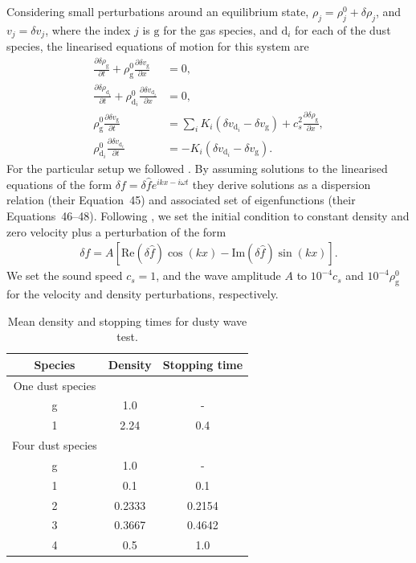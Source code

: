 \documentclass[fleqn,usenatbib]{mnras}
\newcommand{\g}{\mathrm{g}}
\newcommand{\dd}{\mathrm{d}}
\begin{document}
Considering small perturbations around an equilibrium state, \(\rho_j = \rho_j^0
+ \delta \rho_j\), and \(v_j = \delta v_j\), where the index \(j\) is \(\g\) for
the gas species, and \(\dd_i\) for each of the dust species, the linearised
equations of motion for this system are
%
\begin{align}
   \frac{\partial \delta \rho_{\g}}{\partial t}
      + \rho_{\g}^0 \frac{\partial \delta v_{\g}}{\partial x} &= 0, \\
   \frac{\partial \delta \rho_{\dd_i}}{\partial t}
      + \rho_{\dd_i}^0 \frac{\partial \delta v_{\dd_i}}{\partial x} &= 0, \\
   \rho_{\g}^0 \frac{\partial \delta v_{\g}}{\partial t}
      &= \sum_i K_i \left(\delta v_{\dd_i} - \delta v_{\g} \right)
         + c_s^2 \frac{\partial \delta \rho_{\g}}{\partial x}, \\
   \rho_{\dd_i}^0 \frac{\partial \delta v_{\dd_i}}{\partial t}
      &= - K_i \left(\delta v_{\dd_i} - \delta v_{\g}\right).
\end{align}
%
For the particular setup we followed \citet{Benitez-Llambay2019ApJS..241...25B}.
By assuming solutions to the linearised equations of the form \(\delta f =
\delta \hat{f} e^{ikx - i\omega t}\) they derive solutions as a dispersion
relation (their Equation~45) and associated set of eigenfunctions (their
Equations~46--48). Following \citet{Benitez-Llambay2019ApJS..241...25B}, we set
the initial condition to constant density and zero velocity plus a perturbation
of the form
%
\begin{align}
   \delta f = A \left[\mathrm{Re} \left(\delta \hat{f} \right) \cos(kx)
      - \mathrm{Im} \left(\delta \hat{f} \right) \sin(kx) \right].
\end{align}
%
We set the sound speed \(c_s = 1\), and the wave amplitude \(A\) to \(10^{-4}
c_s\) and \(10^{-4} \rho_{\g}^0\) for the velocity and density perturbations,
respectively.

\begin{table}
   \centering
   \begin{tabular}{ccc}
      \hline
      \hline
      Species & Density & Stopping time \\
      \hline
      \hline
      One dust species \\
      g & 1.0 & - \\
      1 & 2.24 & 0.4 \\
      \hline
      Four dust species \\
      g & 1.0 & - \\
      1 & 0.1 & 0.1 \\
      2 & 0.2333 & 0.2154 \\
      3 & 0.3667 & 0.4642 \\
      4 & 0.5 & 1.0 \\
      \hline
      \hline
   \end{tabular}
   \caption{Mean density and stopping times for dusty wave test.}%
   \label{tab:wave}
\end{table}
\end{document}
